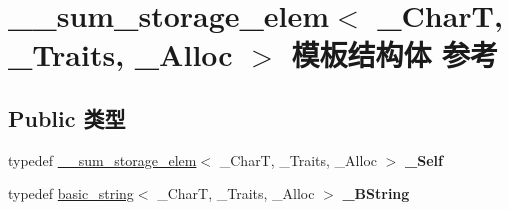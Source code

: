 \hypertarget{struct____sum__storage__elem}{}\section{\+\_\+\+\_\+sum\+\_\+storage\+\_\+elem$<$ \+\_\+\+CharT, \+\_\+\+Traits, \+\_\+\+Alloc $>$ 模板结构体 参考}
\label{struct____sum__storage__elem}
\subsection*{Public 类型}
\begin{DoxyCompactItemize}
\item 
\mbox{\label{struct____sum__storage__elem_a4dacde2e613de81d2cad245e9d0beae8}} 
typedef \hyperlink{struct____sum__storage__elem}{\+\_\+\+\_\+sum\+\_\+storage\+\_\+elem}$<$ \+\_\+\+CharT, \+\_\+\+Traits, \+\_\+\+Alloc $>$ {\bfseries \+\_\+\+Self}
\item 
\mbox{\label{struct____sum__storage__elem_a95d370648453cf169b698f6f9c3fae5d}} 
typedef \hyperlink{classbasic__string}{basic\+\_\+string}$<$ \+\_\+\+CharT, \+\_\+\+Traits, \+\_\+\+Alloc $>$ {\bfseries \+\_\+\+B\+String}
\end{DoxyCompactItemize}
